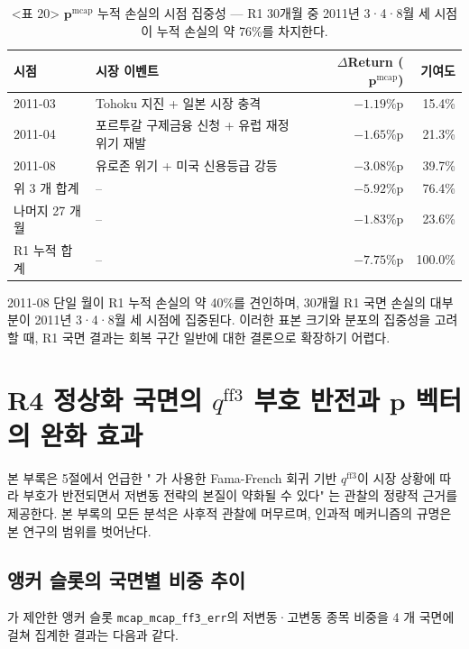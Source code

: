 \documentclass{article}
\begin{document}
\begin{table}[ht]
\centering
\caption{<표 20> $\mathbf{p}^{\mathrm{mcap}}$ 누적 손실의 시점 집중성 — R1 30개월 중
2011년 3·4·8월 세 시점이 누적 손실의 약 76\%를 차지한다.}
\label{tab:r1_loss_concentration}
\setlength{\tabcolsep}{8pt}
\renewcommand{\arraystretch}{1.2}
\small
\begin{tabular}{llrr}
\toprule
시점 & 시장 이벤트 & $\Delta$Return ($\mathbf{p}^{\mathrm{mcap}}$) & 기여도 \\
\midrule
2011-03 & Tohoku 지진 + 일본 시장 충격              & $-1.19$\%p & 15.4\% \\
2011-04 & 포르투갈 구제금융 신청 + 유럽 재정위기 재발 & $-1.65$\%p & 21.3\% \\
2011-08 & 유로존 위기 + 미국 신용등급 강등           & $-3.08$\%p & 39.7\% \\
\midrule
위 3 개 합계 & --                                  & $-5.92$\%p & 76.4\% \\
나머지 27 개월 & --                                & $-1.83$\%p & 23.6\% \\
\midrule
R1 누적 합계 & --                                  & $-7.75$\%p & 100.0\% \\
\bottomrule
\end{tabular}
\end{table}

2011-08 단일 월이 R1 누적 손실의 약 40\%를 견인하며, 30개월 R1 국면 손실의 대부분이 2011년 3·4·8월 세 시점에 집중된다. 이러한 표본 크기와 분포의 집중성을 고려할 때, R1 국면 결과는 회복 구간 일반에 대한 결론으로 확장하기 어렵다.

\section{R4 정상화 국면의 $q^{\mathrm{ff3}}$ 부호 반전과 $\mathbf{p}$ 벡터의 완화 효과}\label{app:r4_mechanism}

본 부록은 5절에서 언급한 "\citet{pyo2018} 가 사용한 Fama-French 회귀 기반 $q^{\mathrm{ff3}}$이 시장 상황에 따라 부호가 반전되면서 저변동 전략의 본질이 약화될 수 있다" 는 관찰의 정량적 근거를 제공한다. 본 부록의 모든 분석은 사후적 관찰에 머무르며, 인과적 메커니즘의 규명은 본 연구의 범위를 벗어난다.

\subsection{앵커 슬롯의 국면별 비중 추이}

\citet{pyo2018}가 제안한 앵커 슬롯 \texttt{mcap\_mcap\_ff3\_err}의 저변동·고변동 종목 비중을 4 개 국면에 걸쳐 집계한 결과는 다음과 같다.
\end{document}
